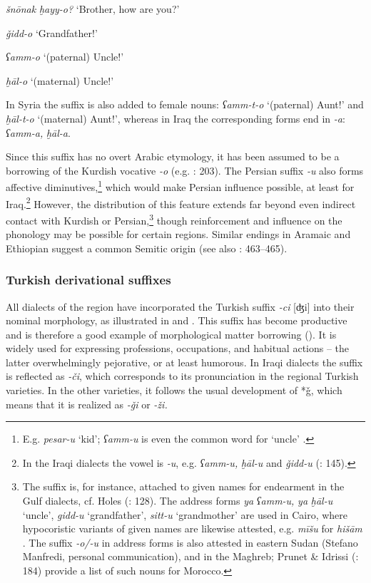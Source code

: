 \documentclass[output=paper]{langsci/langscibook}
\begin{document}
\textit{šnōnak} \textit{ḫayy-o?} ‘Brother, how are you?’

\textit{ǧidd-o} ‘Grandfather!’

\textit{ʕamm-o} ‘(paternal) Uncle!’

\textit{ḫāl-o} ‘(maternal) Uncle!’
\z

In Syria the suffix is also added to female nouns: \textit{ʕamm-t-o} ‘(paternal) Aunt!’ and \textit{ḫāl-t-o} ‘(maternal) Aunt!’, whereas in Iraq the corresponding forms end in \textit{{}-a}: \textit{ʕamm-a,} \textit{ḫāl-a}.

Since this suffix has no overt Arabic etymology, it has been assumed to be a borrowing of the Kurdish vocative \textit{-o} (e.g. \citealt{Grigore2007book}: 203). The Persian suffix \textit{-u} also forms affective diminutives,\footnote{E.g. \textit{pesar-u} ‘kid’; \textit{ʕamm-u} is even the common word for ‘uncle’ \citep[1011]{Perry2007}.} which would make Persian influence possible, at least for Iraq.\footnote{In the Iraqi dialects the vowel is \textit{-u}, e.g. \textit{ʕamm-u,} \textit{ḫāl-u} and \textit{ǧidd-u} (\citealt{Abu-Haidar1999}: 145).} However, the distribution of this feature extends far beyond even indirect contact with Kurdish or Persian,\footnote{The suffix is, for instance, attached to given names for endearment in the Gulf dialects, cf. Holes (\citeyear{Holes2016}: 128). The address forms \textit{ya} \textit{ʕamm-u,} \textit{ya} \textit{ḫāl-u} ‘uncle’, \textit{gidd-u} ‘grandfather’, \textit{sitt-u} ‘grandmother’ are used in Cairo, where hypocoristic variants of given names are likewise attested, e.g. \textit{mīšu} for \textit{hišām} \citep[109]{Woidich2006}. The suffix \textit{-o/-u} in address forms is also attested in eastern Sudan (Stefano Manfredi, personal communication), and in the Maghreb; Prunet \& Idrissi (\citeyear{PrunetIdrissi2014}: 184) provide a list of such nouns for Morocco.} though reinforcement and influence on the phonology may be possible for certain regions. Similar endings in Aramaic \citep[88--89]{Fassberg2010} and Ethiopian \citep[122]{Brockelmann1928} suggest a common Semitic origin (see also \citealt{Pat-El2017}: 463--465). 

\subsubsection{Turkish derivational suffixes}
All dialects of the region have incorporated the Turkish suffix \textit{-ci} [ʤi] into their nominal morphology, as illustrated in  and . This suffix has become productive and is therefore a good example of morphological matter borrowing (\citealt{GardaniArkadievAmiridze2015}). It is widely used for expressing professions, occupations, and habitual actions – the latter overwhelmingly pejorative, or at least humorous. In Iraqi dialects the suffix is reflected as \textit{-či}, which corresponds to its pronunciation in the regional Turkish varieties. In the other varieties, it follows the usual development of *ǧ, which means that it is realized as \textit{-ǧi} or \textit{-ži.} 
\end{document}
